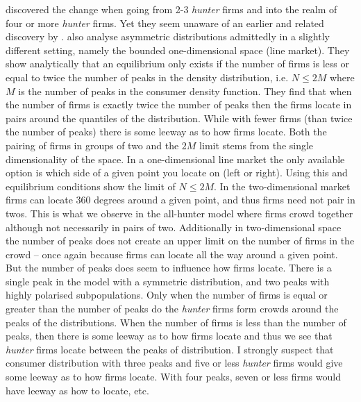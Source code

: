 \documentclass[preprint, 12pt]{elsarticle}
\begin{document}
\citet[chapter~5]{Laver_Sergenti_2011} discovered the change when going from 2-3 \emph{hunter} firms and into the realm of four or more \emph{hunter} firms. Yet they seem unaware of an earlier and related discovery by \citet{Eaton_Lipsey_1975}. \citet{Eaton_Lipsey_1975} also analyse asymmetric distributions admittedly in a slightly different setting, namely the bounded one-dimensional space (line market). They show analytically that an equilibrium only exists if the number of firms is less or equal to twice the number of peaks in the density distribution, i.e. $N \le 2M$ where $M$ is the number of peaks in the consumer density function. They find that when the number of firms is exactly twice the number of peaks then the firms locate in pairs around the quantiles of the distribution. While with fewer firms (than twice the number of peaks) there is some leeway as to how firms locate. Both the pairing of firms in groups of two and the $2M$ limit stems from the single dimensionality of the space. In a one-dimensional line market the only available option is which side of a given point you locate on (left or right). Using this and equilibrium conditions \citet{Eaton_Lipsey_1975} show the limit of $N \le 2M$. In the two-dimensional market firms can locate 360 degrees around a given point, and thus firms need not pair in twos. This is what we observe in the all-hunter model where firms crowd together although not necessarily in pairs of two. Additionally in two-dimensional space the number of peaks does not create an upper limit on the number of firms in the crowd -- once again because firms can locate all the way around a given point. But the number of peaks does seem to influence how firms locate. There is a single peak in the model with a symmetric distribution, and two peaks with highly polarised subpopulations. Only when the number of firms is equal or greater than the number of peaks do the \emph{hunter} firms form crowds around the peaks of the distributions. When the number of firms is less than the number of peaks, then there is some leeway as to how firms locate and thus we see that \emph{hunter} firms locate between the peaks of distribution. I strongly suspect that consumer distribution with three peaks and five or less \emph{hunter} firms would give some leeway as to how firms locate. With four peaks, seven or less firms would have leeway as how to locate, etc.
\end{document}
